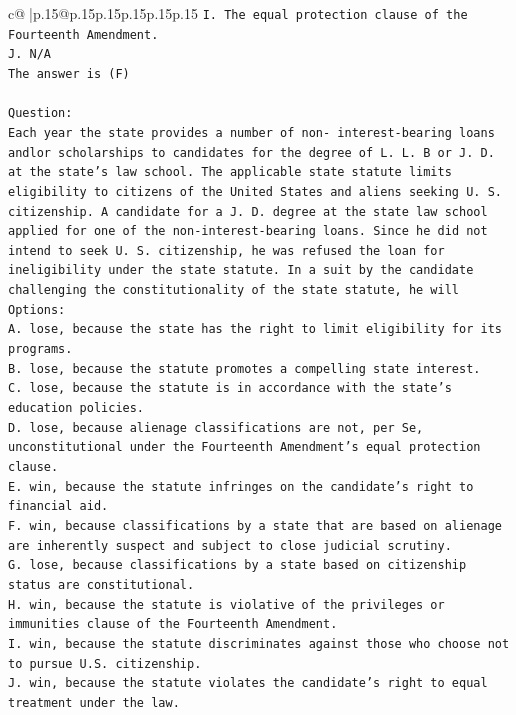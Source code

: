 \documentclass{article}
\begin{document}
{\begin{supertabular}{c@{$\;$}|p{.15\linewidth}@{}p{.15\linewidth}p{.15\linewidth}p{.15\linewidth}p{.15\linewidth}p{.15\linewidth}}
{{{\texttt{I. The equal protection clause of the Fourteenth Amendment.} \\
\texttt{J. N/A} \\
\texttt{The answer is (F)} \\
\\ 
\texttt{Question:} \\
\texttt{Each year the state provides a number of non{-} interest{-}bearing loans andlor scholarships to candidates for the degree of L. L. B or J. D. at the state's law school. The applicable state statute limits eligibility to citizens of the United States and aliens seeking U. S. citizenship. A candidate for a J. D. degree at the state law school applied for one of the non{-}interest{-}bearing loans. Since he did not intend to seek U. S. citizenship, he was refused the loan for ineligibility under the state statute. In a suit by the candidate challenging the constitutionality of the state statute, he will} \\
\texttt{Options:} \\
\texttt{A. lose, because the state has the right to limit eligibility for its programs.} \\
\texttt{B. lose, because the statute promotes a compelling state interest.} \\
\texttt{C. lose, because the statute is in accordance with the state's education policies.} \\
\texttt{D. lose, because alienage classifications are not, per Se, unconstitutional under the Fourteenth Amendment's equal protection clause.} \\
\texttt{E. win, because the statute infringes on the candidate's right to financial aid.} \\
\texttt{F. win, because classifications by a state that are based on alienage are inherently suspect and subject to close judicial scrutiny.} \\
\texttt{G. lose, because classifications by a state based on citizenship status are constitutional.} \\
\texttt{H. win, because the statute is violative of the privileges or immunities clause of the Fourteenth Amendment.} \\
\texttt{I. win, because the statute discriminates against those who choose not to pursue U.S. citizenship.} \\
\texttt{J. win, because the statute violates the candidate's right to equal treatment under the law.} \\
            }
        }
    }
     \\ \\


\end{supertabular}}
\end{document}
